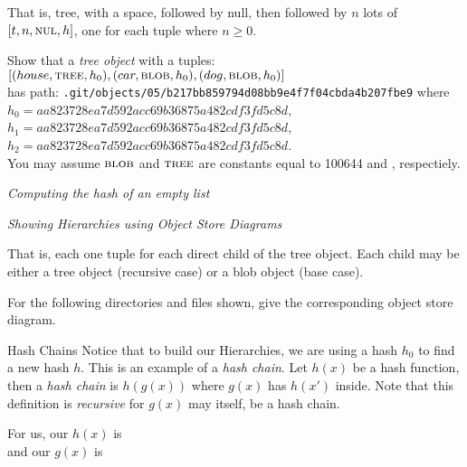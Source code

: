 That is, tree, with a space, followed by null, 
then followed by $n$ lots of $[t,n,\textsc{nul},h]$, 
one for each tuple where $n \geqslant 0$. 

\frmrule 

\begin{example}
Show that a \textit{tree object} with a tuples:\\
$[(house,\textsc{tree},h_0),(car,\textsc{blob},h_0),(dog,\textsc{blob},h_0)]$\\
has path:
\lstinline{.git/objects/05/b217bb859794d08bb9e4f7f04cbda4b207fbe9}
where \\$h_0 = aa823728ea7d592acc69b36875a482cdf3fd5c8d$,\\
$h_1 = aa823728ea7d592acc69b36875a482cdf3fd5c8d$,\\
$h_2 = aa823728ea7d592acc69b36875a482cdf3fd5c8d$.\\
You may assume $\textsc{blob}$ and $\textsc{tree}$ are constants equal to 100644
and , respectiely.
\end{example}

\frmrule 

\textit{Computing the hash of an empty list}



\frmrule 

\textit{Showing Hierarchies using Object Store Diagrams}



That is, each one tuple for each direct child of the tree object. 
Each child may be either a tree object (recursive case) or a 
blob object (base case).


\frmrule 

\begin{example}
For the following directories and files shown, give the corresponding 
object store diagram.
\end{example}

\frmrule 


\begin{sidenote}{Hash Chains}
Notice that to build our Hierarchies, we are using a hash $h_0$ to find a new hash $h$. 
This is an example of a \textit{hash chain}. Let $h(x)$ be a 
hash function, then a \textit{hash chain}
is $h(g(x))$ where $g(x)$ has $h(x')$ inside. 
Note that this definition is \textit{recursive} for $g(x)$ may itself, 
be a hash chain. 

For us, our $h(x)$ is \\
and our $g(x)$ is\\
\end{sidenote}




